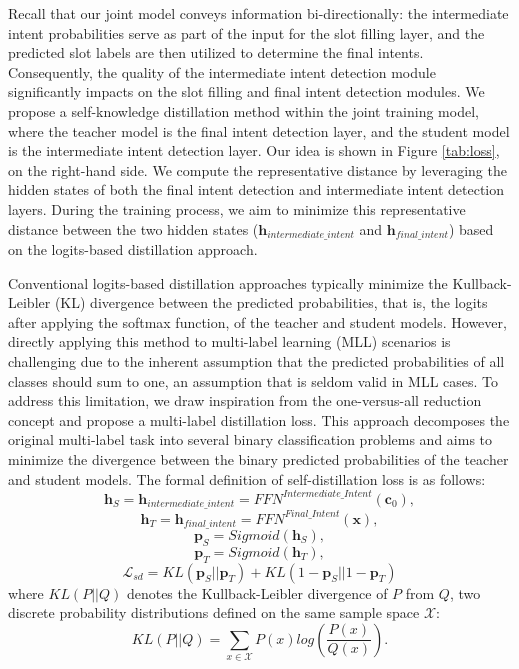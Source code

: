 \documentclass{ecai}
\begin{document}
Recall that our joint model conveys information bi-directionally: the intermediate intent probabilities serve as part of the input for the slot filling layer, and the predicted slot labels are then utilized to determine the final intents. Consequently, the quality of the intermediate intent detection module significantly impacts on the slot filling and final intent detection modules. We propose a self-knowledge distillation method within the joint training model, where the teacher model is the final intent detection layer, and the student model is the intermediate intent detection layer. Our idea is shown in Figure \ref{tab:loss}, on the right-hand side. We compute the representative distance by leveraging the hidden states of both the final intent detection and intermediate intent detection layers. During the training process, we aim to minimize this representative distance between the two hidden states ($\textbf{h}_{intermediate\_intent}$ and $\textbf{h}_{final\_intent}$) based on the logits-based distillation approach.

Conventional logits-based distillation approaches typically minimize the Kullback-Leibler (KL) divergence between the predicted probabilities, that is, the logits after applying the softmax function, of the teacher and student models. However, directly applying this method to multi-label learning (MLL) scenarios is challenging due to the inherent assumption that the predicted probabilities of all classes should sum to one, an assumption that is seldom valid in MLL cases. To address this limitation, we draw inspiration from the one-versus-all reduction concept and propose a multi-label distillation loss. This approach decomposes the original multi-label task into several binary classification problems and aims to minimize the divergence between the binary predicted probabilities of the teacher and student models. The formal definition of self-distillation loss is as follows:
$$\textbf{h}_{S} = \textbf{h}_{intermediate\_intent} = FFN^{Intermediate\_Intent}(\textbf{c}_0),$$
$$\textbf{h}_{T} = \textbf{h}_{final\_intent} = FFN^{Final\_Intent}(\textbf{x}),$$
$$\textbf{p}_{S} = Sigmoid(\textbf{h}_{S}),$$
$$\textbf{p}_{T} = Sigmoid(\textbf{h}_{T}),$$
$$\mathcal{L}_{sd} = KL(\textbf{p}_{S}||\textbf{p}_{T}) + KL(1- \textbf{p}_{S}||1 - \textbf{p}_{T})$$
where $KL(P||Q)$ denotes the Kullback-Leibler divergence of $P$ from $Q$, two discrete probability distributions defined on the same sample space $\mathcal{X}$:
$$KL(P||Q)=\sum_{x \in \mathcal{X}}P(x)log(\frac{P(x)}{Q(x)}).$$
\end{document}
